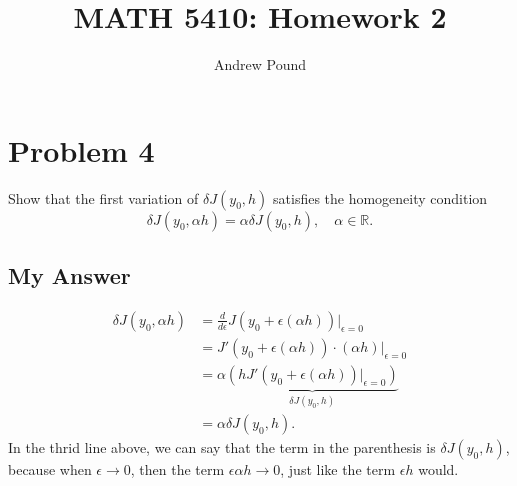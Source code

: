 \documentclass{article}
\title{MATH 5410: Homework 2}
\author{Andrew Pound}
\begin{document}
\maketitle



\section*{Problem 4}
Show that the first variation of $\delta J (y_0, h)$ satisfies the
homogeneity condition
\begin{equation*}
  \delta J(y_0, \alpha h) = \alpha\delta J(y_0, h), \quad \alpha \in
  \mathbb{R}. 
\end{equation*}

\subsection*{My Answer}
\begin{equation*}
  \begin{split}
    \delta J(y_0, \alpha h) 
    &= \frac{d}{d\epsilon}J(y_0 + \epsilon (\alpha h))|_{\epsilon =0}\\ 
    & = J'(y_0 + \epsilon(\alpha h))\cdot(\alpha h)|_{\epsilon =0}\\ 
    & = \alpha \underbrace{\left(hJ'(y_0 +  \epsilon(\alpha h))|_{\epsilon
        =0}\right)}_{\delta J(y_0,h)}\\
    &= \alpha\delta J(y_0, h). 
  \end{split}
\end{equation*}
In the thrid line above, we can say that the term in the parenthesis
is $\delta J(y_0,h)$, because when $\epsilon \rightarrow 0$, then the
term $\epsilon\alpha h \rightarrow 0$, just like the term $\epsilon h$
would.
\end{document}
